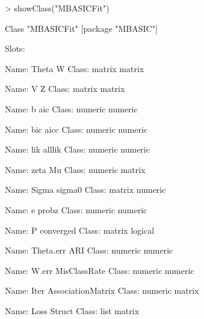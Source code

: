 \documentclass[a4paper,10pt]{article}
\begin{document}
\begin{Schunk}
\begin{Sinput}
> showClass("MBASICFit")
\end{Sinput}
\begin{Soutput}
Class "MBASICFit" [package "MBASIC"]

Slots:
                                          
Name:              Theta                 W
Class:            matrix            matrix
                                          
Name:                  V                 Z
Class:            matrix            matrix
                                          
Name:                  b               aic
Class:           numeric           numeric
                                          
Name:                bic              aicc
Class:           numeric           numeric
                                          
Name:                lik            alllik
Class:           numeric           numeric
                                          
Name:               zeta                Mu
Class:           numeric            matrix
                                          
Name:              Sigma            sigma0
Class:            matrix           numeric
                                          
Name:                  e             probz
Class:           numeric           numeric
                                          
Name:                  P         converged
Class:            matrix           logical
                                          
Name:          Theta.err               ARI
Class:           numeric           numeric
                                          
Name:              W.err      MisClassRate
Class:           numeric           numeric
                                          
Name:               Iter AssociationMatrix
Class:           numeric            matrix
                                          
Name:               Loss            Struct
Class:              list            matrix
\end{Soutput}
\end{Schunk}
\end{document}
